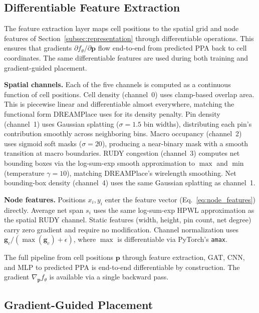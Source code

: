 \documentclass[sigconf,anonymous,review,9pt]{acmart}
\begin{document}
\subsection{Differentiable Feature Extraction}
\label{subsec:diff_features}

The feature extraction layer maps cell positions to the spatial grid
and node features of Section~\ref{subsec:representation} through
differentiable operations. This ensures that gradients
$\partial f_\theta / \partial \mathbf{p}$ flow end-to-end from
predicted PPA back to cell coordinates. The same differentiable
features are used during both training and gradient-guided placement.

\textbf{Spatial channels.} Each of the five channels is computed as a
continuous function of cell positions. Cell density (channel~0) uses
clamp-based overlap area. This is piecewise linear and differentiable
almost everywhere, matching the functional form DREAMPlace uses for
its density penalty. Pin density (channel~1) uses Gaussian splatting
($\sigma = 1.5$ bin widths), distributing each pin's contribution
smoothly across neighboring bins. Macro occupancy (channel~2) uses
sigmoid soft masks ($\sigma = 20$), producing a near-binary mask with
a smooth transition at macro boundaries. RUDY congestion (channel~3)
computes net bounding boxes via the log-sum-exp smooth approximation
to $\max$ and $\min$ (temperature $\gamma = 10$), matching
DREAMPlace's wirelength smoothing. Net bounding-box density
(channel~4) uses the same Gaussian splatting as channel~1.

\textbf{Node features.} Positions $x_i, y_i$ enter the feature vector
(Eq.~\ref{eq:node_features}) directly. Average net span $s_i$ uses
the same log-sum-exp HPWL approximation as the spatial RUDY channel.
Static features (width, height, pin count, net degree) carry zero
gradient and require no modification. Channel normalization uses
$\mathbf{g}_c / (\max(\mathbf{g}_c) + \epsilon)$, where $\max$ is
differentiable via PyTorch's \texttt{amax}.

The full pipeline from cell positions $\mathbf{p}$ through feature
extraction, GAT, CNN, and MLP to predicted PPA is end-to-end
differentiable by construction. The gradient
$\nabla_{\mathbf{p}} f_\theta$ is available via a single backward
pass.


\subsection{Gradient-Guided Placement}
\label{subsec:gradient_placement}
\end{document}
